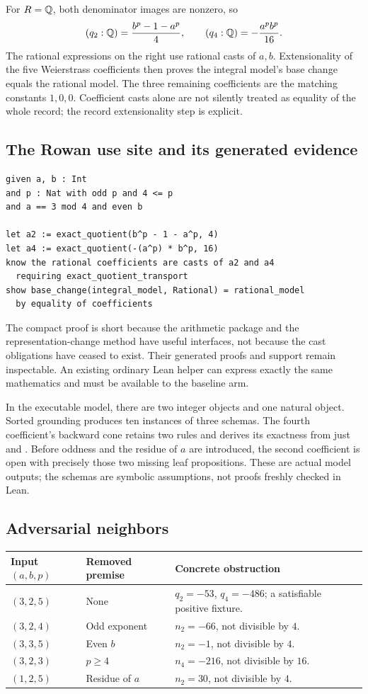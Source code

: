 \documentclass[11pt,letterpaper]{article}
\newcommand{\code}[1]{\texttt{\detokenize{#1}}}
\theoremstyle{definition}\newtheorem{definition}[theorem]{Definition}
\theoremstyle{remark}\newtheorem{remark}[theorem]{Remark}
\begin{document}
For $R=\mathbb Q$, both denominator images are nonzero, so
\[
 (q_2:\mathbb Q)=\frac{b^p-1-a^p}{4},\qquad
 (q_4:\mathbb Q)=-\frac{a^pb^p}{16}.
\]
The rational expressions on the right use rational casts of $a,b$. Extensionality
of the five Weierstrass coefficients then proves the integral model's base
change equals the rational model. The three remaining coefficients are the
matching constants $1,0,0$. Coefficient casts alone are not silently treated
as equality of the whole record; the record extensionality step is explicit.

\subsection{The Rowan use site and its generated evidence}
\begin{lstlisting}
given a, b : Int
and p : Nat with odd p and 4 <= p
and a == 3 mod 4 and even b

let a2 := exact_quotient(b^p - 1 - a^p, 4)
let a4 := exact_quotient(-(a^p) * b^p, 16)
know the rational coefficients are casts of a2 and a4
  requiring exact_quotient_transport
show base_change(integral_model, Rational) = rational_model
  by equality of coefficients
\end{lstlisting}
The compact proof is short because the arithmetic package and the
representation-change method have useful interfaces, not because the cast
obligations have ceased to exist. Their generated proofs and support remain
inspectable. An existing ordinary Lean helper can express exactly the same
mathematics and must be available to the baseline arm.

In the executable model, there are two integer objects and one natural
object. Sorted grounding produces ten instances of three schemas. The fourth
coefficient's backward cone retains two rules and derives its exactness from
just \code{even_b} and \code{bound_p}. Before oddness and the residue of $a$
are introduced, the second coefficient is open with precisely those two
missing leaf propositions. These are actual model outputs; the schemas are
symbolic assumptions, not proofs freshly checked in Lean.

\subsection{Adversarial neighbors}
\begin{center}\small
\begin{tabularx}{\textwidth}{@{}l l Y@{}}
\toprule Input $(a,b,p)$ & Removed premise & Concrete obstruction\\\midrule
$(3,2,5)$ & None & $q_2=-53$, $q_4=-486$; a satisfiable positive fixture.\\
$(3,2,4)$ & Odd exponent & $n_2=-66$, not divisible by $4$.\\
$(3,3,5)$ & Even $b$ & $n_2=-1$, not divisible by $4$.\\
$(3,2,3)$ & $p\ge4$ & $n_4=-216$, not divisible by $16$.\\
$(1,2,5)$ & Residue of $a$ & $n_2=30$, not divisible by $4$.\\
\bottomrule
\end{tabularx}
\end{center}
\end{document}
